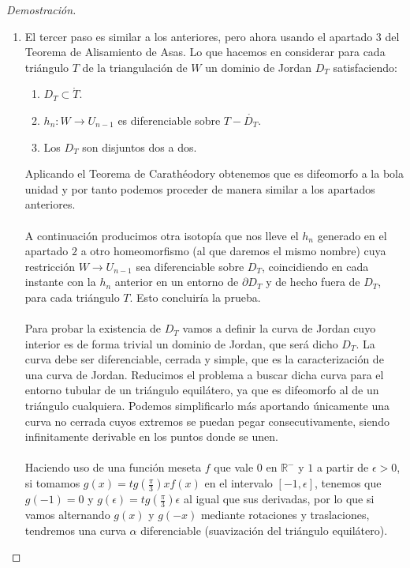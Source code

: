\begin{proof}[Demostración]
\begin{enumerate}
			\item El tercer paso es similar a los anteriores, pero ahora usando el apartado $3$ del Teorema de Alisamiento de Asas. Lo que hacemos en considerar para cada triángulo $T$ de la triangulación de $W$ un dominio de Jordan $D_T$ satisfaciendo:
			\begin{enumerate}
				\item $D_T \subset \mathring{T}$.
				\item $h_n:W \rightarrow U_{n-1}$ es diferenciable sobre $T-\mathring{D_T}$.
				\item Los $D_T$ son disjuntos dos a dos.
			\end{enumerate}
			
			Aplicando el Teorema de Carathéodory obtenemos que es difeomorfo a la bola unidad y por tanto podemos proceder de manera similar a los apartados anteriores. \\
			\\ A continuación producimos otra isotopía que nos lleve el $h_n$ generado en el apartado $2$ a otro homeomorfismo (al que daremos el mismo nombre) cuya restricción $W \rightarrow U_{n-1}$ sea diferenciable sobre $D_T$, coincidiendo en cada instante con la $h_n$ anterior en un entorno de $\partial D_T$ y de hecho fuera de $D_T$, para cada triángulo $T$. Esto concluiría la prueba. \\
			\\ Para probar la existencia de $D_T$ vamos a definir la curva de Jordan cuyo interior es de forma trivial un dominio de Jordan, que será dicho $D_T$. La curva debe ser diferenciable, cerrada y simple, que es la caracterización de una curva de Jordan. Reducimos el problema a buscar dicha curva para el entorno tubular de un triángulo equilátero, ya que es difeomorfo al de un triángulo cualquiera. Podemos simplificarlo más aportando únicamente una curva no cerrada cuyos extremos se puedan pegar consecutivamente, siendo infinitamente derivable en los puntos donde se unen.\\
			\\ Haciendo uso de una función meseta $f$ que vale $0$ en $\mathbb{R}^-$ y $1$ a partir de $\epsilon > 0$, si tomamos $g(x)=tg(\frac{\pi}{3})xf(x)$ en el intervalo $[-1,\epsilon]$, tenemos que $g(-1)=0$ y $g(\epsilon)=tg(\frac{\pi}{3})\epsilon$  al igual que sus derivadas, por lo que si vamos alternando $g(x)$ y $g(-x)$ mediante rotaciones y traslaciones, tendremos una curva $\alpha$ diferenciable (suavización del triángulo equilátero). \\

\end{enumerate}
\end{proof}
